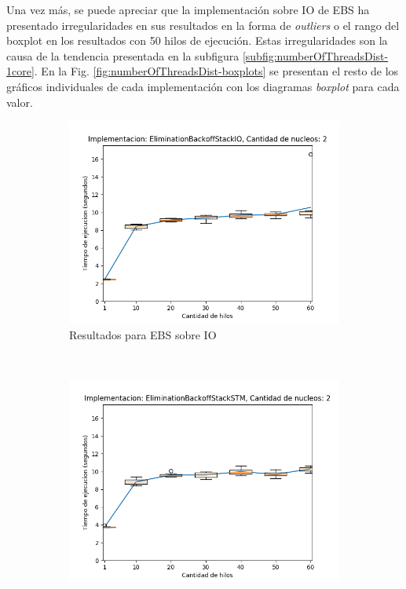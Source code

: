 Una vez más, se puede apreciar que la implementación sobre IO de EBS ha presentado irregularidades en sus resultados en la forma de \emph{outliers} o el rango del boxplot en los resultados con 50 hilos de ejecución.
Estas irregularidades son la causa de la tendencia presentada en la subfigura \ref{subfig:numberOfThreadsDist-1core}.
En la Fig. \ref{fig:numberOfThreadsDist-boxplots} se presentan el resto de los gráficos individuales de cada implementación con los diagramas \emph{boxplot} para cada valor.


\begin{figure}[t]
       \centering
    \begin{subfigure}[b]{0.49\textwidth}
        \includegraphics[width=\textwidth]{images/numberOfThreadsDist/plots/expEBSIO-2}
        \caption{Resultados para EBS sobre IO}
        \label{subfig:numberOfThreadsDist-ebsio-2}
    \end{subfigure}
    ~
    \begin{subfigure}[b]{0.49\textwidth}
        \includegraphics[width=\textwidth]{images/numberOfThreadsDist/plots/expEBSSTM-2}

\end{subfigure}
\end{figure}
